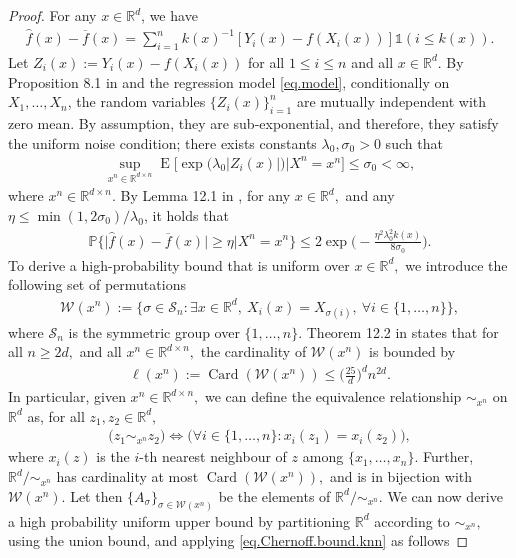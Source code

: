 \documentclass[10pt]{article}
\newcommand{\mS}{\mathcal{S}}
\newcommand{\mW}{\mathcal{W}}
\newcommand{\PP}{\mathbb{P}}
\newcommand{\RR}{\mathbb{R}}
\newcommand{\E}{\operatorname{E}}
\newcommand{\wh}{\widehat}
\newcommand{\ol}{\overline}
\newcommand{\card}{\operatorname{Card}}
\begin{document}
\begin{proof}
For any $x \in \RR^d$, we have
\begin{align*}
\wh f(x)-\ol f(x)=\sum_{i=1}^nk(x)^{-1}[Y_i(x)-f(X_i(x))]\mathds{1}(i \leq k(x)).
\end{align*}
Let $Z_i(x) := Y_i(x) - f(X_i(x))$ for all $1 \leq i \leq n$ and all $x \in \RR^d.$ By Proposition 8.1 in \cite{Biau2015Lectures} and the regression model \eqref{eq.model}, conditionally on $X_1,\ldots,X_n$, the random variables $\{Z_i(x)\}_{i=1}^n$ are mutually independent with zero mean. By assumption, they are sub-exponential, and therefore, they satisfy the uniform noise condition; there exists constants $\lambda_0, \sigma_0 > 0$ such that
\begin{align}\label{equ::uniformnoise}
\sup_{x^n\in \RR^{d\times n}} 
\E \Big[ \exp\big(\lambda_0|Z_i(x)|\big) \big| X^n = x^n \Big]
\leq \sigma_0 
< \infty,
\end{align}
where $x^n \in \RR^{d\times n}.$ 
By Lemma 12.1 in \cite{Biau2015Lectures}, 
for any $x \in \RR^d,$ and any $\eta \leq \min(1, 2\sigma_0) / \lambda_0$, it holds that
\begin{align}
    \label{eq.Chernoff.bound.knn}
    \PP \Big\{\big|\wh f(x) - \ol f(x)\big| \geq \eta \Big| X^n = x^n \Big\}
    \leq 2 \exp \bigg( - \frac{\eta^2 \lambda_0^2k(x)}{8 \sigma_0} \bigg).
\end{align}
To derive a high-probability bound that is uniform over $x \in \RR^d,$ we introduce the following set of permutations
\begin{align*}
    \mW(x^n) := \bigg\{\sigma \in \mS_n: \exists x \in \RR^d,\ X_i(x) = X_{\sigma(i)},\ \forall i \in \{1, \dots, n\}\bigg\},
\end{align*}
where $\mS_n$ is the symmetric group over $\{1, \dots, n\}.$ Theorem 12.2 in \cite{Biau2015Lectures} states that for all $n \geq 2d,$ and all $x^n \in \RR^{d\times n},$ the cardinality of $\mW(x^n)$ is bounded by
\begin{align*}
    \ell(x^n) := \card(\mW(x^n)) \leq \Big(\frac{25}{d}\Big)^dn^{2d}.
\end{align*}
In particular, given $x^n \in \RR^{d\times n},$ we can define the equivalence relationship $\sim_{x^n}$ on $\RR^d$ as, for all $z_1, z_2 \in \RR^d,$
\begin{align*}
    \big(z_1 \sim_{x^n} z_2\big) \Longleftrightarrow \Big(\forall i \in \{1, \dots, n\}: x_i(z_1) = x_i(z_2)\Big),
\end{align*}
where $x_i(z)$ is the $i$-th nearest neighbour of $z$ among $\{x_1, \dots, x_n\}.$ Further, $\RR^d/\sim_{x^n}$ has cardinality at most $\card(\mW(x^n)),$ and is in bijection with $\mW(x^n).$ Let then $\{A_\sigma\}_{\sigma \in \mW(x^n)}$ be the elements of $\RR^d/\sim_{x^n}.$ We can now derive a high probability uniform upper bound by partitioning $\RR^d$ according to $\sim_{x^n},$ using the union bound, and applying \eqref{eq.Chernoff.bound.knn} as follows 

\end{proof}
\end{document}

